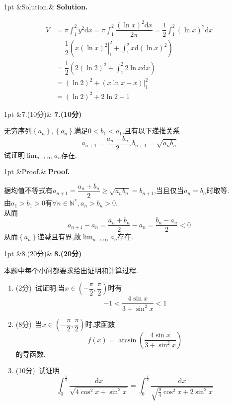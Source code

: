 \documentclass{ctexart}
\newcommand{\di}{\mathrm{d}}
\newcommand{\N}{\mathbb{N}}
\newcommand{\dx}{\di x}
\newenvironment{solution}[1][]{%
\def\FrameCommand{%
\hspace{1pt}%
{\color{solutionline}\vrule width 2pt}%
{\color{solutionshade}\vrule width 4pt}%
\colorbox{solutionshade}%
}%
\MakeFramed{\advance\hsize-\width\FrameRestore}%
\noindent\hspace{-4.55pt}%
\begin{adjustwidth}{}{1pt}%
\setlength{\parindent}{0pt}%
\vspace{3pt}%
\ifx&#1&\else %
    \textbf{#1}\par\vspace{1pt}%
\fi
}
{%
\vspace{2pt}%
\end{adjustwidth}\endMakeFramed%
}
\newenvironment{problem}[1][]{%
\def\FrameCommand{%
\hspace{1pt}%
{\color{problemline}\vrule width 2pt}%
{\color{problemshade}\vrule width 4pt}%
\colorbox{problemshade}%
}%
\MakeFramed{\advance\hsize-\width\FrameRestore}%
\noindent\hspace{-4.55pt}%
\begin{adjustwidth}{}{1pt}%
\setlength{\parindent}{0pt}%
\vspace{3pt}%
\ifx&#1&\else %
    \textbf{#1}\par\vspace{1pt}%
\fi
}
{%
\vspace{2pt}%
\end{adjustwidth}\endMakeFramed%
}
\begin{document}
\begin{solution}[Solution.]
    \begin{align*}
        V
        &= \pi\int_1^2{y^2\dx}=\pi\int_1^2{\dfrac{\left(\ln x\right)^2\dx}{2\pi}}=\dfrac{1}{2}\int_1^2\left(\ln x\right)^2\dx \\
        &= \dfrac{1}{2}\left(\left.x\left(\ln x\right)^2\right|_1^2+\int_1^2x\di\left(\ln x\right)^2\right) \\
        &= \dfrac{1}{2}\left(2\left(\ln 2\right)^2+\int_1^2 2\ln x\dx\right) \\
        &= \left(\ln 2\right)^2+\left.\left(x\ln x-x\right)\right|_1^2 \\
        &= \left(\ln 2\right)^2+2\ln2-1
    \end{align*}
\end{solution}
\begin{problem}[7.(10分)]
    无穷序列$\left\{a_n\right\},\left\{a_n\right\}$满足$0<b_1<a_1$,且有以下递推关系$$a_{n+1}=\dfrac{a_n+b_n}{2},b_{n+1}=\sqrt{a_nb_n}$$试证明$\displaystyle\lim_{n\to\infty}{a_n}$存在.
\end{problem}
\begin{solution}[Proof.]
    据均值不等式有$a_{n+1}=\dfrac{a_n+b_n}{2}\geqslant\sqrt{a_nb_n}=b_{n+1}$,当且仅当$a_n=b_n$时取等.\\
    由$a_1>b_1>0$有$\forall n\in\N^*,a_n>b_n>0.$\\
    从而$$a_{n+1}-a_n=\dfrac{a_n+b_n}{2}-a_n=\dfrac{b_n-a_n}{2}<0$$
    从而$\left\{a_n\right\}$递减且有界,故$\displaystyle\lim_{n\to\infty}{a_n}$存在.
\end{solution}
\begin{problem}[8.(20分)]
    本题中每个小问都要求给出证明和计算过程.
        \begin{enumerate}[label=\textbf{(\arabic*)}]
            \item (2分)\ 试证明:当$x\in\left(-\dfrac{\pi}{2},\dfrac{\pi}{2}\right)$时有$$-1<\dfrac{4\sin{x}}{3+\sin^2{x}}<1$$
            \item (8分)\ 当$x\in\left(-\dfrac{\pi}{2},\dfrac{\pi}{2}\right)$时,求函数$$f(x)=\arcsin{\left(\dfrac{4\sin{x}}{3+\sin^2{x}}\right)}$$的导函数.
            \item (10分)\ 试证明$$\int_{0}^{\frac{\pi}{2}}{\dfrac{\dx}{\sqrt{4\cos^2{x}+\sin^2{x}}}}=\int_{0}^{\frac{\pi}{2}}{\dfrac{\dx}{\sqrt{\frac{9}{4}\cos^2{x}+2\sin^2{x}}}}$$
        \end{enumerate}
\end{problem}
\end{document}
